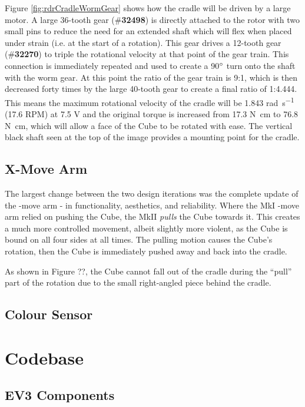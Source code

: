 \documentclass{report}
\newcommand{\tbo}[1]{\textbf{#1}}
\newcommand{\tit}[1]{\textit{#1}}
\newcommand{\legopiece}[1]{(\#\tbo{#1})}
\newcommand{\move}[1]{\uppercase{\texttt{\formatmovesnospace{#1}}}-move}
\begin{document}
	Figure \ref{fig:rdrCradleWormGear} shows how the cradle will be driven by a large motor. A large 36-tooth gear \legopiece{32498} is directly attached to the rotor with two small pins to reduce the need for an extended shaft which will flex when placed under strain (i.e. at the start of a rotation). This gear drives a 12-tooth gear \legopiece{32270} to triple the rotational velocity at that point of the gear train. This connection is immediately repeated and used to create a 90$\degree$ turn onto the shaft with the worm gear. At this point the ratio of the gear train is 9:1, which is then decreased forty times by the large 40-tooth gear to create a final ratio of 1:4.444. This means the maximum rotational velocity of the cradle will be 1.843 \si{\radian\per\second} (17.6 RPM) at 7.5 \si{\volt} and the original torque is increased from 17.3 \si{\newton\centi\metre} to 76.8 \si{\newton\centi\metre}, which will allow a face of the Cube to be rotated with ease. The vertical black shaft seen at the top of the image provides a mounting point for the cradle.
	
	\subsection{X-Move Arm}
    
    The largest change between the two design iterations was the complete update of the \move{x} arm - in functionality, aesthetics, and reliability. Where the MkI \move{x} arm relied on pushing the Cube, the MkII \tit{pulls} the Cube towards it. This creates a much more controlled movement, albeit slightly more violent, as the Cube is bound on all four sides at all times. The pulling motion causes the Cube's rotation, then the Cube is immediately pushed away and back into the cradle.
    
    
    
    
    As shown in Figure ??, the Cube cannot fall out of the cradle during the \enquote{pull} part of the rotation due to the small right-angled piece behind the cradle.
    
    \subsection{Colour Sensor}
    
    \newpage
    \section{Codebase}
    \subsection{EV3 Components} \label{sec:ev3components}
\end{document}
